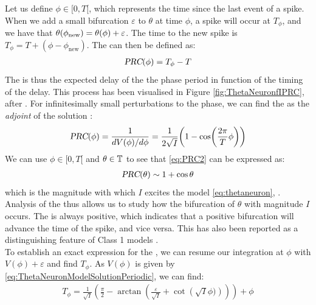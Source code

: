 Let us define $\phi \in [0, T[$, which represents the time since the last event of a spike. When we add a small bifurcation $\varepsilon$ to $\theta$ at time $\phi$, a spike will occur at $T_{\phi}$, and we have that $\theta(\phi_{\rm new}) = \theta(\phi) + \varepsilon$. The time to the new spike is $T_{\phi} = T + (\phi - \phi_{\text{new}})$. The \PRC can then be defined as:
\begin{align}
{\textsl{PRC}}(\phi) =T_{\phi} - T \label{eq:PRC1}
\end{align}
The \PRC is thus the expected delay of the the phase period in function of the timing of the delay. This process has been visualised in Figure \ref{fig:ThetaNeuronfIPRC}, after \cite{Perez2020}. For infinitesimally small perturbations to the phase, we can find the \PRC as the \textsl{adjoint} of the solution \cite{Gutkin2014}:
\begin{align}
\PRC(\phi) = \frac{1}{d V(\phi) / d \phi} = \frac{1}{2 \sqrt{I}} \left(1-\cos \left( \frac{2 \pi}{T} \phi \right) \right) \label{eq:PRC2}
\end{align}
We can use $\phi \in [0, T[$ and $\theta \in {\mathbb{T}}$ to see that \eqref{eq:PRC2} can be expressed as:
\begin{align}
{\textsl{PRC}}(\theta) \sim 1 + \cos \theta  \label{eq:PRC3}
\end{align}
which is the magnitude with which $I$ excites the model \eqref{eq:thetaneuron}, \cite{Ermentrout1996}. Analysis of the \PRC thus allows us to study how the bifurcation of $\theta$ with magnitude $I$ occurs. The \PRC is always positive, which indicates that a positive bifurcation will advance the time of the spike, and vice versa. This has also been reported as a distinguishing feature of Class 1 models \cite{Ermentrout1996}. \\

To establish an exact expression for the \PRC, we can resume our integration at $\phi$ with $V \left( \phi \right) + \varepsilon$ and find $T_{\phi}$.
As $V(\phi)$ is given by \eqref{eq:ThetaNeuronModelSolutionPeriodic}, we can find:
\begin{align*}
T_{\phi} = \frac{1}{\sqrt{I}}\left(\frac{\pi}{2} - \arctan \left(\frac{\varepsilon}{\sqrt{I}} + \cot \left(\sqrt{I} \phi)\right)\right)\right)+\phi
\end{align*}

